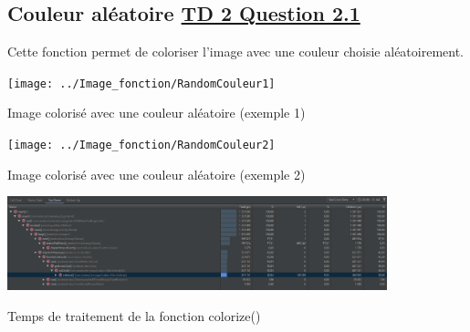 \documentclass{article}
\begin{document}
\subsection{Couleur aléatoire \underline{TD 2 Question 2.1}}
Cette fonction permet de coloriser l'image avec une couleur choisie aléatoirement.
\bigbreak

\begin{center} 
    \texttt{[image: ../Image\_fonction/RandomCouleur1]}

    Image colorisé avec une couleur aléatoire (exemple 1)
\end{center}

\begin{center} 
    \texttt{[image: ../Image\_fonction/RandomCouleur2]}

    Image colorisé avec une couleur aléatoire (exemple 2)
\end{center}

\begin{center} 
    \includegraphics[width=11cm]{../Image_temps/TempsColorize}

    Temps de traitement de la fonction colorize()
\end{center}
\end{document}
